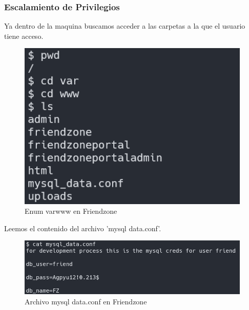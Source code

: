     \subsubsection{Escalamiento de Privilegios}
        \large{Ya dentro de la maquina buscamos acceder a las carpetas a la que el usuario tiene acceso.}
        \par
        \begin{figure}[H]
            \centering
            \includegraphics[width=0.99\textwidth]{informe4/imagenes/friendzone/20_enum_varwww.png}
            \caption{Enum varwww en Friendzone} 
        \end{figure}

        \large{Leemos el contenido del archivo 'mysql data.conf'.}
        \par
        \begin{figure}[H]
            \centering
            \includegraphics[width=0.99\textwidth]{informe4/imagenes/friendzone/21_password_friend.png}
            \caption{Archivo mysql data.conf en Friendzone} 
        \end{figure}

